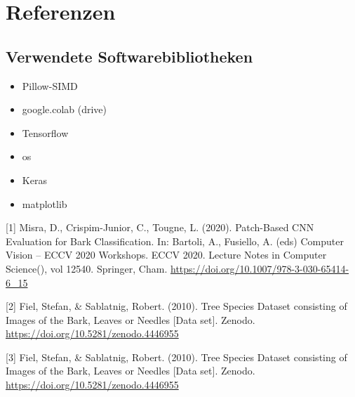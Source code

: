 \documentclass{article}
\begin{document}
\section*{Referenzen}
\subsection*{Verwendete Softwarebibliotheken}
\begin{itemize}
\item Pillow-SIMD
\item google.colab (drive)
\item Tensorflow
\item os
\item Keras
\item matplotlib
\end{itemize}

\medskip
\small
[1] Misra, D., Crispim-Junior, C., Tougne, L. (2020). Patch-Based CNN Evaluation for Bark Classification. In: Bartoli, A., Fusiello, A. (eds) Computer Vision – ECCV 2020 Workshops. ECCV 2020. Lecture Notes in Computer Science(), vol 12540. Springer, Cham. \url{https://doi.org/10.1007/978-3-030-65414-6_15}

[2] Fiel, Stefan, \& Sablatnig, Robert. (2010). Tree Species Dataset consisting of Images of the Bark, Leaves or Needles [Data set]. Zenodo. \url{https://doi.org/10.5281/zenodo.4446955}

[3] Fiel, Stefan, \& Sablatnig, Robert. (2010). Tree Species Dataset consisting of Images of the Bark, Leaves or Needles [Data set]. Zenodo. \url{https://doi.org/10.5281/zenodo.4446955}
\end{document}
